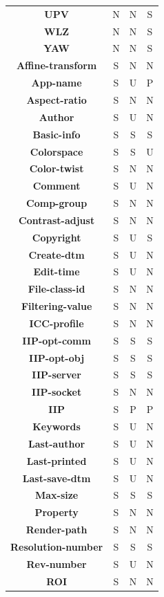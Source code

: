 \documentclass[11pt]{article}
\newcommand{\com}[1]{\textbf{#1}}
\begin{document}
\begin{table}[!hp]
{\begin{tabular}{|c|c|c|c|}
\com{UPV}  & N & N & S \\
\com{WLZ}  & N & N & S \\
\com{YAW}  & N & N & S \\
\hline
\com{Affine-transform}  & S & N & N \\
\com{App-name}          & S & U & P \\
\com{Aspect-ratio}      & S & N & N \\
\com{Author}            & S & U & N \\
\com{Basic-info}        & S & S & S \\
\com{Colorspace}        & S & S & U \\
\com{Color-twist}       & S & N & N \\
\com{Comment}           & S & U & N \\
\com{Comp-group}        & S & N & N \\
\com{Contrast-adjust}   & S & N & N \\
\com{Copyright}         & S & U & S \\
\com{Create-dtm}        & S & U & N \\
\com{Edit-time}         & S & U & N \\
\com{File-class-id}     & S & N & N \\
\com{Filtering-value}   & S & N & N \\
\com{ICC-profile}       & S & N & N \\
\com{IIP-opt-comm}      & S & S & S \\
\com{IIP-opt-obj}       & S & S & S \\
\com{IIP-server}        & S & S & S \\
\com{IIP-socket}        & S & N & N \\
\com{IIP}               & S & P & P \\
\com{Keywords}          & S & U & N \\
\com{Last-author}       & S & U & N \\
\com{Last-printed}      & S & U & N \\
\com{Last-save-dtm}     & S & U & N \\
\com{Max-size}          & S & S & S \\
\com{Property}          & S & N & N \\
\com{Render-path}       & S & N & N \\
\com{Resolution-number} & S & S & S \\
\com{Rev-number}        & S & U & N \\
\com{ROI}               & S & N & N \\

\end{tabular}}
\end{table}
\end{document}
